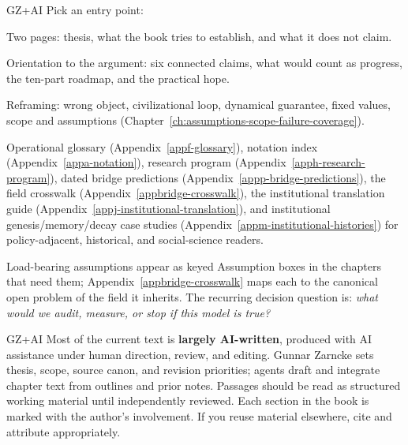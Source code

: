\begin{authbar}{GZ+AI}
Pick an entry point:
\begin{description}[style=nextline,leftmargin=2.5em]
\item[\textbf{Executive Overview}] Two pages: thesis, what the book tries to establish, and what it does not claim.
\item[\textbf{Introduction}] Orientation to the argument: six connected claims, what would count as progress, the ten-part roadmap, and the practical hope.
\item[\textbf{Part~I (Chapters 1--5)}] Reframing: wrong object, civilizational loop, dynamical guarantee, fixed values, scope and assumptions (Chapter~\ref{ch:assumptions-scope-failure-coverage}).
\item[\textbf{Appendices}] Operational glossary (Appendix~\ref{appf-glossary}), notation index (Appendix~\ref{appa-notation}), research program (Appendix~\ref{apph-research-program}), dated bridge predictions (Appendix~\ref{appp-bridge-predictions}), the field crosswalk (Appendix~\ref{appbridge-crosswalk}), the institutional translation guide (Appendix~\ref{appj-institutional-translation}), and institutional genesis/memory/decay case studies (Appendix~\ref{appm-institutional-histories}) for policy-adjacent, historical, and social-science readers.
\end{description}

Load-bearing assumptions appear as keyed Assumption boxes in the chapters that need them; Appendix~\ref{appbridge-crosswalk} maps each to the canonical open problem of the field it inherits.
The recurring decision question is: \emph{what would we audit, measure, or stop if this model is true?}
\end{authbar}


\begin{authbar}{GZ+AI}
Most of the current text is \textbf{largely AI-written}, produced with AI assistance under human direction, review, and editing.
Gunnar Zarncke sets thesis, scope, source canon, and revision priorities; agents draft and integrate chapter text from outlines and prior notes.
Passages should be read as structured working material until independently reviewed. Each section in the book is marked with the author's involvement.
If you reuse material elsewhere, cite and attribute appropriately.
\end{authbar}
